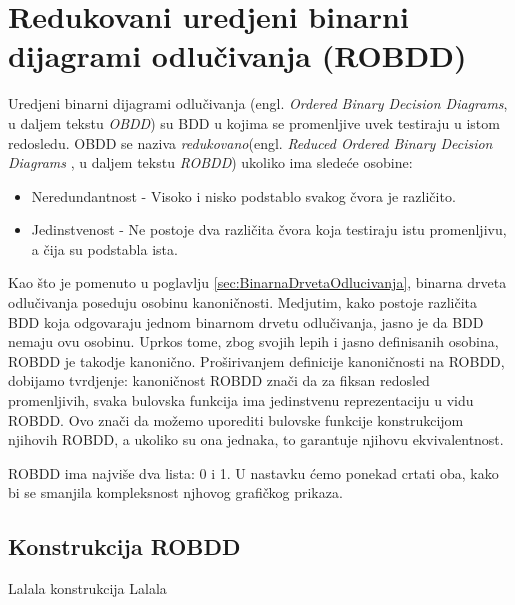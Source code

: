 \section{Redukovani uredjeni binarni dijagrami odlu\v{c}ivanja (ROBDD)}
\label{sec:OBDD}

Uredjeni binarni dijagrami odlu\v{c}ivanja (engl. \emph{Ordered Binary Decision Diagrams}, u daljem tekstu \emph{OBDD}) su BDD u kojima se promenljive uvek testiraju u istom redosledu. OBDD se naziva \emph{redukovano}(engl. \emph{Reduced Ordered Binary Decision Diagrams} \cite{ROBDD}, u daljem tekstu \emph{ROBDD}) ukoliko ima slede\'c{}e osobine:
\begin{itemize}
    \item Neredundantnost - Visoko i nisko podstablo svakog \v{c}vora je razli\v{c}ito.
    \item Jedinstvenost - Ne postoje dva razli\v{c}ita \v{c}vora koja testiraju istu promenljivu, a \v{c}ija su podstabla ista.
\end{itemize}

Kao \v{s}to je pomenuto u poglavlju \ref{sec:BinarnaDrvetaOdlucivanja}, binarna drveta odlu\v{c}ivanja poseduju osobinu kanoni\v{c}nosti. Medjutim, kako postoje razli\v{c}ita BDD koja odgovaraju jednom binarnom drvetu odlu\v{c}ivanja, jasno je da BDD nemaju ovu osobinu. Uprkos tome, zbog svojih lepih i jasno definisanih osobina, ROBDD je takodje kanoni\v{c}no. Pro\v{s}irivanjem definicije kanoni\v{c}nosti na ROBDD, dobijamo tvrdjenje: kanoni\v{c}nost ROBDD zna\v{c}i da za fiksan redosled promenljivih, svaka bulovska funkcija ima jedinstvenu reprezentaciju u vidu ROBDD. Ovo zna\v{c}i da mo\v{z}emo uporediti bulovske funkcije konstrukcijom njihovih ROBDD, a ukoliko su ona jednaka, to garantuje njihovu ekvivalentnost.

ROBDD ima najvi\v{s}e dva lista: 0 i 1. U nastavku \'c{}emo ponekad crtati oba, kako bi se smanjila kompleksnost njhovog grafi\v{c}kog prikaza.



\subsection{Konstrukcija ROBDD}
\label{subsec:ROBDDConstruction}

Lalala konstrukcija Lalala

